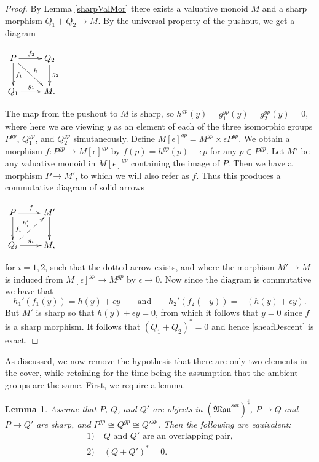 \documentclass[12pt]{amsart}
\numberwithin{equation}{section}
\theoremstyle{plain}
\newtheorem{lem}[equation]{Lemma}
\theoremstyle{remark}
\newcommand{\Mon}{\mathfrak{Mon}}
\begin{document}
\begin{proof}
By Lemma \eqref{sharpValMor} there exists a valuative monoid $M$ and a sharp morphism $Q_1 + Q_2\to M$. By the universal property of the pushout, we get a diagram
\begin{center}
	$\xymatrix{
		P \ar[r]^{f_2}\ar[d]^{f_1}\ar[dr]^{h} & Q_2\ar[d]^{g_2}\\	
		Q_1\ar[r]^{g_1} & M.\\
	}$
\end{center}
The map from the pushout to $M$ is sharp, so $h^{gp}(y) = g_1^{gp}(y) = g_2^{gp}(y) = 0$, where here we are viewing $y$ as an element of each of the three isomorphic groups $P^{gp}$, $Q_1^{gp}$, and $Q_2^{gp}$ simutaneously. Define $M[\epsilon]^{gp} = M^{gp}\times \epsilon P^{gp}$. We obtain a morphism $f: P^{gp}\to M[\epsilon]^{gp}$ by $f(p) = h^{gp}(p) + \epsilon p$ for any $p\in P^{gp}$. Let $M'$ be any valuative monoid in $M[\epsilon]^{gp}$ containing the image of $P$. Then we have a morphism $P\to M'$, to which we will also refer as $f$. Thus this produces a commutative diagram of solid arrows
\begin{center}
	$\xymatrix{
		P\ar[r]^{f}\ar[d]^{f_i} & M'\ar[d]\\
		Q_i \ar[r]^{g_i} \ar@{-->}[ur]^{h_i'} & M,\\
	}$
\end{center}
for $i = 1,2$, such that the dotted arrow exists, and where the morphism $M'\to M$ is induced from $M[\epsilon]^{gp}\to M^{gp}$ by $\epsilon\to 0$. Now since the diagram is commutative we have that 
	$$h_1'(f_1(y)) = h(y) + \epsilon y\qquad\text{and}\qquad h_2'(f_2(-y)) = -(h(y) + \epsilon y).$$
But $M'$ is sharp so that $h(y) + \epsilon y = 0$, from which it follows that $y = 0$ since $f$ is a sharp morphism. It follows that $(Q_1 + Q_2)^* = 0$ and hence \eqref{sheafDescent} is exact. 
\end{proof}
As discussed, we now remove the hypothesis that there are only two elements in the cover, while retaining for the time being the assumption that the ambient groups are the same. First, we require a lemma.
\begin{lem}\label{sameGrpPush}
	Assume that $P$, $Q$, and $Q'$ are objects in $(\Mon^{sat})^{\sharp}$, $P\to Q$ and $P\to Q'$ are sharp, and $P^{gp}\cong Q^{gp} \cong Q'^{gp}$. Then the following are equivalent:
	\begin{align*}
		1) & \;Q \text{ and } Q' \text{ are an overlapping pair,}\\
		2) & \;(Q + Q')^* = 0.\\
	\end{align*}	
\end{lem}
\end{document}

